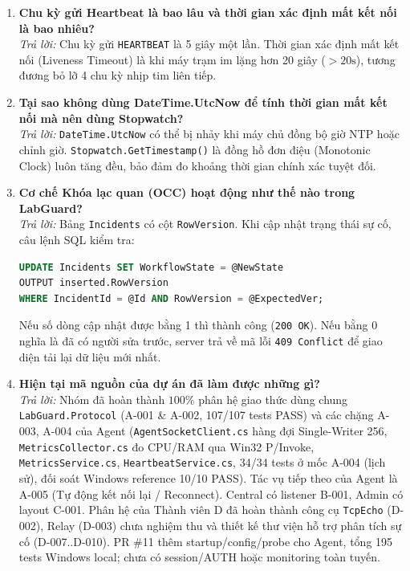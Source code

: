 \documentclass[12pt,a4paper]{article}
\begin{document}
\begin{enumerate}[leftmargin=*, label=\textbf{Câu \arabic*:}]
    \textit{Trả lời:} Đúng 6 trường cố định: \texttt{version} (int = 1), \texttt{messageType} (string), \texttt{requestId} (GUID string), \texttt{deviceId} (string), \texttt{sentAtUtc} (ISO 8601 với offset UTC bằng 0: \texttt{Z} hoặc \texttt{+00:00}), và \texttt{payload} (generic T).
  \item \textbf{Chu kỳ gửi Heartbeat là bao lâu và thời gian xác định mất kết nối là bao nhiêu?} \\
    \textit{Trả lời:} Chu kỳ gửi \texttt{HEARTBEAT} là 5 giây một lần. Thời gian xác định mất kết nối (Liveness Timeout) là khi máy trạm im lặng hơn 20 giây ($> 20\text{s}$), tương đương bỏ lỡ 4 chu kỳ nhịp tim liên tiếp.
  \item \textbf{Tại sao không dùng DateTime.UtcNow để tính thời gian mất kết nối mà nên dùng Stopwatch?} \\
    \textit{Trả lời:} \texttt{DateTime.UtcNow} có thể bị nhảy khi máy chủ đồng bộ giờ NTP hoặc chỉnh giờ. \texttt{Stopwatch.GetTimestamp()} là đồng hồ đơn điệu (Monotonic Clock) luôn tăng đều, bảo đảm đo khoảng thời gian chính xác tuyệt đối.
  \item \textbf{Cơ chế Khóa lạc quan (OCC) hoạt động như thế nào trong LabGuard?} \\
    \textit{Trả lời:} Bảng \texttt{Incidents} có cột \texttt{RowVersion}. Khi cập nhật trạng thái sự cố, câu lệnh SQL kiểm tra:
\begin{lstlisting}[language=sql]
UPDATE Incidents SET WorkflowState = @NewState
OUTPUT inserted.RowVersion
WHERE IncidentId = @Id AND RowVersion = @ExpectedVer;
\end{lstlisting}
    Nếu số dòng cập nhật được bằng 1 thì thành công (\texttt{200 OK}). Nếu bằng 0 nghĩa là đã có người sửa trước, server trả về mã lỗi \texttt{409 Conflict} để giao diện tải lại dữ liệu mới nhất.
  \item \textbf{Hiện tại mã nguồn của dự án đã làm được những gì?} \\
    \textit{Trả lời:} Nhóm đã hoàn thành $100\%$ phân hệ giao thức dùng chung \texttt{LabGuard.Protocol} (A-001 \& A-002, 107/107 tests PASS) và các chặng A-003, A-004 của Agent (\texttt{AgentSocketClient.cs} hàng đợi Single-Writer 256, \texttt{MetricsCollector.cs} đo CPU/RAM qua Win32 P/Invoke, \texttt{MetricsService.cs}, \texttt{HeartbeatService.cs}, 34/34 tests ở mốc A-004 (lịch sử), đối soát Windows reference 10/10 PASS). Tác vụ tiếp theo của Agent là A-005 (Tự động kết nối lại / Reconnect). Central có listener B-001, Admin có layout C-001. Phân hệ của Thành viên D đã hoàn thành công cụ \texttt{TcpEcho} (D-002), Relay (D-003) chưa nghiệm thu và thiết kế thư viện hỗ trợ phân tích sự cố (D-007..D-010). PR \#11 thêm startup/config/probe cho Agent, tổng 195 tests Windows local; chưa có session/AUTH hoặc monitoring toàn tuyến.

\end{enumerate}
\end{document}

